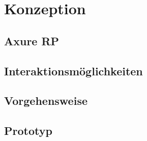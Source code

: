 \chapter{Konzeption}\label{ch:experiments}

\section {Axure RP}
\section{Interaktionsmöglichkeiten}
\section{Vorgehensweise}
\section{Prototyp}
